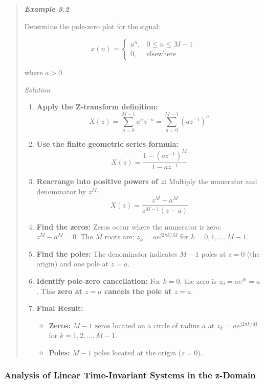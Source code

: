 \begin{quote}
\textbf{\emph{Example 3.2}}

Determine the pole-zero plot for the signal:

\[
x(n) =
\begin{cases}
a^n, & 0 \le n \le M-1 \\
0, & \text{elsewhere}
\end{cases}
\]

where \(a > 0\).

\emph{Solution}

\begin{enumerate}
\def\labelenumi{\arabic{enumi}.}
\tightlist
\item
  \textbf{Apply the Z-transform definition:}
  \[X(z) = \sum_{n=0}^{M-1} a^n z^{-n} = \sum_{n=0}^{M-1} (az^{-1})^n\]
\item
  \textbf{Use the finite geometric series formula:}
  \[X(z) = \frac{1 - (az^{-1})^M}{1 - az^{-1}}\]
\item
  \textbf{Rearrange into positive powers of \(z\):} Multiply the
  numerator and denominator by \(z^M\):
  \[X(z) = \frac{z^M - a^M}{z^{M-1}(z - a)}\]
\item
  \textbf{Find the zeros:} Zeros occur where the numerator is zero:
  \(z^M - a^M = 0\). The \(M\) roots are:
  \textbf{\(z_k = a e^{j 2\pi k / M}\)} for \(k = 0, 1, \dots, M-1\).
\item
  \textbf{Find the poles:} The denominator indicates \(M-1\) poles at
  \textbf{\(z = 0\)} (the origin) and one pole at \textbf{\(z = a\)}.
\item
  \textbf{Identify pole-zero cancellation:} For \(k = 0\), the zero is
  \(z_0 = a e^{j0} = a\). This \textbf{zero at \(z = a\) cancels the
  pole at \(z = a\)}.
\item
  \textbf{Final Result:}

  \begin{itemize}
  \tightlist
  \item
    \textbf{Zeros:} \(M-1\) zeros located on a circle of radius \(a\) at
    \(z_k = a e^{j 2\pi k / M}\) for \(k = 1, 2, \dots, M-1\).
  \item
    \textbf{Poles:} \(M-1\) poles located at the origin (\(z = 0\)).
  \end{itemize}
\end{enumerate}
\end{quote}

\subsubsection{Analysis of Linear Time-Invariant Systems in the
z-Domain}\label{analysis-of-linear-time-invariant-systems-in-the-z-domain}

